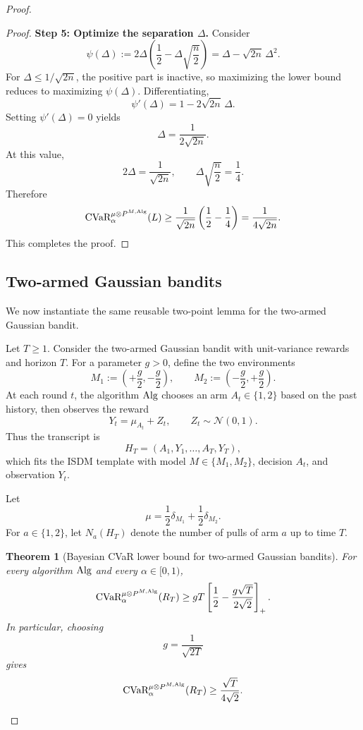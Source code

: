 \documentclass[conference]{IEEEtran}
\newtheorem{theorem}{Theorem}
\begin{document}
\begin{proof}[Proof]
\begin{proof}
\medskip
\noindent
\textbf{Step 5: Optimize the separation \(\Delta\).}
Consider
\[
\psi(\Delta):=
2\Delta\left(\frac12-\Delta\sqrt{\frac{n}{2}}\right)
=
\Delta-\sqrt{2n}\,\Delta^2.
\]
For \(\Delta\le 1/\sqrt{2n}\), the positive part is inactive, so maximizing the lower bound reduces to maximizing \(\psi(\Delta)\). Differentiating,
\[
\psi'(\Delta)=1-2\sqrt{2n}\,\Delta.
\]
Setting \(\psi'(\Delta)=0\) yields
\[
\Delta=\frac{1}{2\sqrt{2n}}.
\]
At this value,
\[
2\Delta=\frac{1}{\sqrt{2n}},
\qquad
\Delta\sqrt{\frac{n}{2}}=\frac14.
\]
Therefore
\[
\textup{CVaR}_\alpha^{\mu\otimes P^{M,\textup{Alg}}}(L)
\ge
\frac{1}{\sqrt{2n}}\left(\frac12-\frac14\right)
=
\frac{1}{4\sqrt{2n}}.
\]
This completes the proof.
\end{proof}

\subsection{Two-armed Gaussian bandits}

We now instantiate the same reusable two-point lemma for the two-armed Gaussian bandit.

Let \(T\ge 1\). Consider the two-armed Gaussian bandit with unit-variance rewards and horizon \(T\). For a parameter \(g>0\), define the two environments
\[
M_1:=\left(+\frac{g}{2},-\frac{g}{2}\right),
\qquad
M_2:=\left(-\frac{g}{2},+\frac{g}{2}\right).
\]
At each round \(t\), the algorithm \(\textup{Alg}\) chooses an arm \(A_t\in\{1,2\}\) based on the past history, then observes the reward
\[
Y_t=\mu_{A_t}+Z_t,
\qquad
Z_t\sim \mathcal{N}(0,1).
\]
Thus the transcript is
\[
H_T=(A_1,Y_1,\dots,A_T,Y_T),
\]
which fits the ISDM template with model \(M\in\{M_1,M_2\}\), decision \(A_t\), and observation \(Y_t\).

Let
\[
\mu=\frac12\delta_{M_1}+\frac12\delta_{M_2}.
\]
For \(a\in\{1,2\}\), let \(N_a(H_T)\) denote the number of pulls of arm \(a\) up to time \(T\).

\begin{theorem}[Bayesian \textup{CVaR} lower bound for two-armed Gaussian bandits]
\label{thm:two-armed-gaussian-cvar-reusable}
For every algorithm \(\textup{Alg}\) and every \(\alpha\in[0,1)\),
\[
\textup{CVaR}_\alpha^{\mu\otimes P^{M,\textup{Alg}}}(R_T)
\ge
gT\left[\frac12-\frac{g\sqrt{T}}{2\sqrt{2}}\right]_+.
\]
In particular, choosing
\[
g=\frac{1}{\sqrt{2T}}
\]
gives
\[
\textup{CVaR}_\alpha^{\mu\otimes P^{M,\textup{Alg}}}(R_T)
\ge
\frac{\sqrt{T}}{4\sqrt{2}}.
\]
\end{theorem}


\end{proof}
\end{document}
